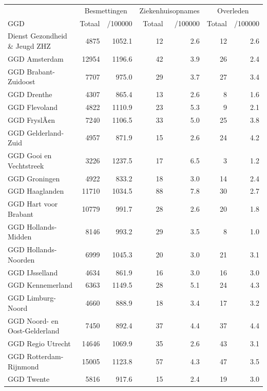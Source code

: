 \documentclass[
  english,
  man,floatsintext]{apa6}
\begin{document}
\begin{table}
\centering\begingroup\fontsize{10}{12}\selectfont

\begin{threeparttable}
\begin{tabular}{lrrrrrr}
\toprule
\multicolumn{1}{c}{ } & \multicolumn{2}{c}{Besmettingen} & \multicolumn{2}{c}{Ziekenhuisopnames} & \multicolumn{2}{c}{Overleden} \\
\cmidrule(l{3pt}r{3pt}){2-3} \cmidrule(l{3pt}r{3pt}){4-5} \cmidrule(l{3pt}r{3pt}){6-7}
GGD & Totaal & /100000 & Totaal & /100000 & Totaal & /100000\\
\midrule
Dienst Gezondheid \& Jeugd ZHZ & 4875 & 1052.1 & 12 & 2.6 & 12 & 2.6\\
GGD Amsterdam & 12954 & 1196.6 & 42 & 3.9 & 26 & 2.4\\
GGD Brabant-Zuidoost & 7707 & 975.0 & 29 & 3.7 & 27 & 3.4\\
GGD Drenthe & 4307 & 865.4 & 13 & 2.6 & 8 & 1.6\\
GGD Flevoland & 4822 & 1110.9 & 23 & 5.3 & 9 & 2.1\\
GGD FryslÃ¢n & 7240 & 1106.5 & 33 & 5.0 & 25 & 3.8\\
GGD Gelderland-Zuid & 4957 & 871.9 & 15 & 2.6 & 24 & 4.2\\
GGD Gooi en Vechtstreek & 3226 & 1237.5 & 17 & 6.5 & 3 & 1.2\\
GGD Groningen & 4922 & 833.2 & 18 & 3.0 & 14 & 2.4\\
GGD Haaglanden & 11710 & 1034.5 & 88 & 7.8 & 30 & 2.7\\
GGD Hart voor Brabant & 10779 & 991.7 & 28 & 2.6 & 20 & 1.8\\
GGD Hollands-Midden & 8146 & 993.2 & 29 & 3.5 & 8 & 1.0\\
GGD Hollands-Noorden & 6999 & 1045.3 & 20 & 3.0 & 21 & 3.1\\
GGD IJsselland & 4634 & 861.9 & 16 & 3.0 & 16 & 3.0\\
GGD Kennemerland & 6363 & 1149.5 & 28 & 5.1 & 24 & 4.3\\
GGD Limburg-Noord & 4660 & 888.9 & 18 & 3.4 & 17 & 3.2\\
GGD Noord- en Oost-Gelderland & 7450 & 892.4 & 37 & 4.4 & 37 & 4.4\\
GGD Regio Utrecht & 14646 & 1069.9 & 35 & 2.6 & 43 & 3.1\\
GGD Rotterdam-Rijnmond & 15005 & 1123.8 & 57 & 4.3 & 47 & 3.5\\
GGD Twente & 5816 & 917.6 & 15 & 2.4 & 19 & 3.0\\

\end{tabular}
\end{threeparttable}
\end{table}
\end{document}
